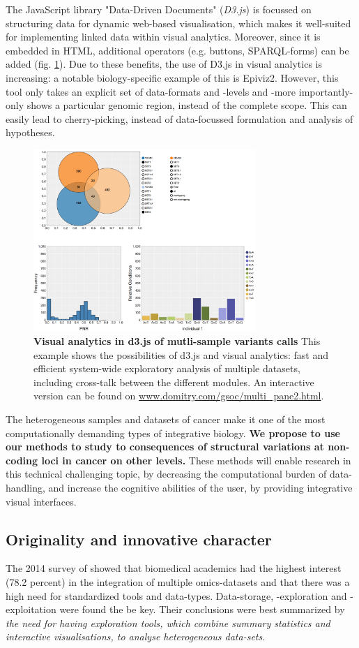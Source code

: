 \documentclass[twoside,fontsize=10pt]{article}
\begin{document}
The JavaScript library "Data-Driven Documents" (\textit{D3.js}) is focussed on structuring data for dynamic web-based visualisation, which makes it well-suited for implementing linked data within visual analytics\cite{Bostock2011}. Moreover, since it is embedded in HTML, additional operators (e.g. buttons, SPARQL-forms) can be added (fig. \ref{fig:nya}). Due to these benefits, the use of D3.js in visual analytics is increasing: a notable biology-specific example of this is Epiviz2\cite{Chelaru2014}. However, this tool only takes an explicit set of data-formats and -levels and -more importantly- only shows a particular genomic region, instead of the complete scope. This can easily lead to cherry-picking, instead of data-focussed formulation and analysis of hypotheses.
\medskip
\begin{figure}[H]
    \centering
    \includegraphics[width=0.75\textwidth]{nyeplot}
    \caption{\textbf{Visual analytics in d3.js of mutli-sample variants calls} This example shows the possibilities of d3.js and visual analytics: fast and efficient system-wide exploratory analysis of multiple datasets, including cross-talk between the different modules. An interactive version can be found on \url{www.domitry.com/gsoc/multi_pane2.html}.}
    \label{fig:nya}
\end{figure}
\noindent 
The heterogeneous samples and datasets of cancer make it one of the most computationally demanding types of integrative biology. \textbf{We propose to use our methods to study to consequences of structural variations at non-coding loci in cancer on other levels.}  These methods will enable research in this technical challenging topic, by decreasing the computational burden of data-handling, and increase the cognitive abilities of the user, by providing integrative visual interfaces. 
\newpage\subsection*{Originality and innovative character} 
The 2014 survey of \citet{Gomez-Cabrero2014} showed that biomedical academics had the highest interest (78.2 percent) in the integration of multiple omics-datasets and that there was a high need for standardized tools and data-types. Data-storage, -exploration and -exploitation were found the be key. Their conclusions were best summarized by \textit{the need for having exploration tools, which combine summary statistics and interactive visualisations, to analyse heterogeneous data-sets}.
\medskip
\end{document}
